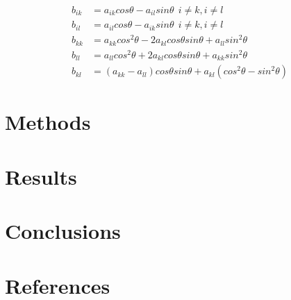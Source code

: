 \documentclass[12pt]{article}
\begin{document}
\begin{align*}
    b_{ik} &= a_{ik}cos\theta-a_{il}sin\theta\ \ i\neq k, i \neq l\\
    b_{il} &= a_{il}cos\theta-a_{ik}sin\theta\ \ i\neq k, i \neq l\\
    b_{kk} &= a_{kk}cos^2\theta-2a_{kl}cos\theta sin\theta + a_ {ll}sin^2\theta\\
    b_{ll} &= a_{ll}cos^2\theta+2a_{kl}cos\theta sin\theta + a_ {kk}sin^2\theta\\
    b_ {kl} &= (a_{kk}-a_{ll})cos\theta sin\theta +a_{kl}(cos^2\theta-sin^2\theta)
\end{align*}


\section*{Methods}

\section*{Results}


\section*{Conclusions}

\section*{References}
\end{document}
